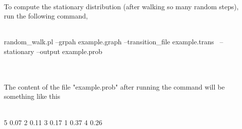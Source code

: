\\
To compute the stationary distribution (after walking so many random steps), run the following command,
\\
\\
\begin{boxedverbatim}
 random_walk.pl --grpah example.graph --transition_file example.trans \
 --stationary --output example.prob
\end{boxedverbatim}
\\
\\
The content of the file "example.prob" after running the command will be something like this
\\
\\
\begin{boxedverbatim}
 5 0.07             
 2 0.11
 3 0.17
 1 0.37
 4 0.26
\end{boxedverbatim}